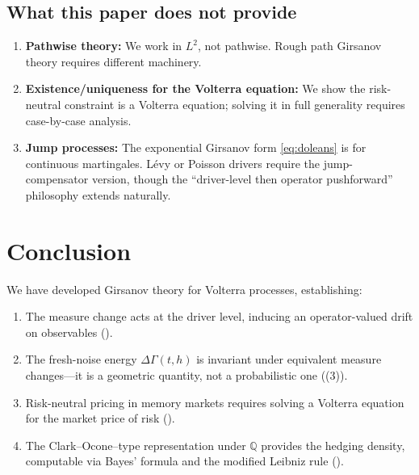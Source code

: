 \documentclass[11pt]{article}
\theoremstyle{plain}
\theoremstyle{definition}
\theoremstyle{remark}
\newcommand{\QQ}{\mathbb{Q}}
\newcommand{\dGamma}{\Delta\Gamma}
\begin{document}
\subsection{What this paper does not provide}

\begin{enumerate}
\item \textbf{Pathwise theory:} We work in $L^2$, not pathwise. Rough path
Girsanov theory requires different machinery.
\item \textbf{Existence/uniqueness for the Volterra equation:} We show the
risk-neutral constraint is a Volterra equation; solving it in full generality
requires case-by-case analysis.
\item \textbf{Jump processes:} The exponential Girsanov form \eqref{eq:doleans}
is for continuous martingales. L\'evy or Poisson drivers require the
jump-compensator version, though the ``driver-level then operator pushforward''
philosophy extends naturally.
\end{enumerate}

\section{Conclusion}\label{sec:conclusion}

We have developed Girsanov theory for Volterra processes, establishing:

\begin{enumerate}
\item The measure change acts at the driver level, inducing an operator-valued
drift on observables ().

\item The fresh-noise energy $\dGamma(t,h)$ is invariant under equivalent
measure changes---it is a geometric quantity, not a probabilistic one
((3)).

\item Risk-neutral pricing in memory markets requires solving a Volterra
equation for the market price of risk ().

\item The Clark--Ocone--type representation under $\QQ$ provides the hedging
density, computable via Bayes' formula and the modified Leibniz rule
().
\end{enumerate}
\end{document}
